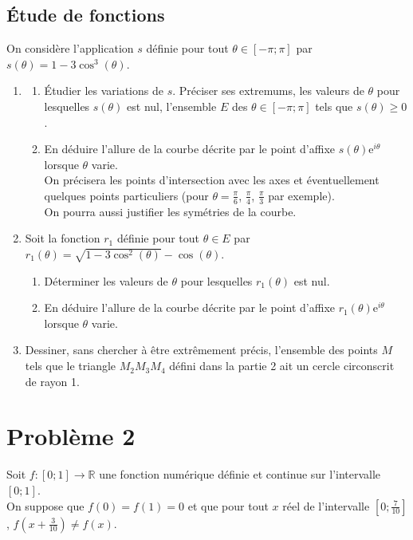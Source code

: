 \documentclass[landscape,twocolumn,leqno,a4paper,10pt]{report} %
\newcommand\n{\noindent}
\renewcommand{\geq}{\geqslant}
\newcommand{\e}{\mathrm{e}}
\begin{document}
\subsection{Étude de fonctions}

\n On considère l'application $s$ définie pour tout $\theta \in[-\pi ; \pi]$ par $s(\theta)=1-3 \cos ^{3}(\theta)$.

\begin{enumerate}
	\item \begin{enumerate}
		\item Étudier les variations de $s$. Préciser ses extremums, les valeurs de $\theta$ pour lesquelles $s(\theta)$ est nul, l'ensemble $E$ des $\theta \in[-\pi ; \pi]$ tels que $s(\theta) \geq 0$.
		\item En déduire l'allure de la courbe décrite par le point d'affixe $s(\theta) \e^{i \theta}$ lorsque $\theta$ varie.\\
		On précisera les points d'intersection avec les axes et éventuellement quelques points particuliers (pour $\theta=\frac{\pi}{6}$, $\frac{\pi}{4}$, $\frac{\pi}{3}$ par exemple).\\
		On pourra aussi justifier les symétries de la courbe.
	\end{enumerate}
	\item Soit la fonction $r_{1}$ définie pour tout $\theta \in E$ par $r_{1}(\theta)=\sqrt{1-3 \cos ^{2}(\theta)}-\cos (\theta)$.
	\begin{enumerate}
		\item Déterminer les valeurs de $\theta$ pour lesquelles $r_{1}(\theta)$ est nul.
		\item En déduire l'allure de la courbe décrite par le point d'affixe $r_{1}(\theta) \e^{i \theta}$ lorsque $\theta$ varie.
	\end{enumerate}
	\item Dessiner, sans chercher à être extrêmement précis, l'ensemble des points $M$ tels que le triangle $M_{2} M_{3} M_{4}$ défini dans la partie 2 ait un cercle circonscrit de rayon 1.
\end{enumerate}

\section{Problème 2}

\n Soit $f:[0 ; 1] \longrightarrow \mathbb{R}$ une fonction numérique définie et continue sur l'intervalle $[0 ; 1]$.\\
On suppose que $f(0)=f(1)=0$ et que pour tout $x$ réel de l'intervalle $\left[0 ; \frac{7}{10}\right]$, $f\left(x+\frac{3}{10}\right) \neq f(x)$.
\end{document}
